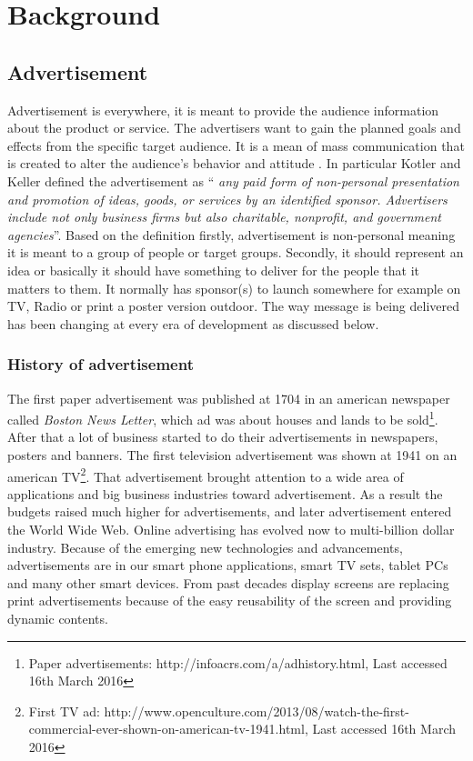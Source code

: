 
\chapter{Background} %

\label{Chapter2} %
\newpage

\section{Advertisement}
Advertisement is everywhere, it is meant to provide the audience information about the product or service. The advertisers want to gain the planned goals and effects from the specific target audience. It is a mean of mass communication that is created to alter the audience’s behavior and attitude \cite{advertisementdef}. In particular Kotler and Keller \cite{ad_def} defined the advertisement as ``\emph{ any paid form of non-personal presentation and promotion of ideas, goods, or services by an identified sponsor. Advertisers include not only business firms but also charitable, nonprofit, and government agencies}''. Based on the definition firstly, advertisement is non-personal meaning it is meant to a group of people or target groups. Secondly, it should represent an idea or basically it should have something to deliver for the people that it matters to them. It normally has sponsor(s) to launch somewhere for example on TV, Radio or print a poster version outdoor. The way message is being delivered has been changing at every era of development as discussed below.



\subsection{History of advertisement}
The first paper advertisement was published at 1704 in an american newspaper called \emph{Boston News Letter}, which ad was about houses and lands to be sold\footnote{Paper advertisements: http://infoacrs.com/a/adhistory.html, Last accessed 16th March 2016}. After that a lot of business started to do their advertisements in newspapers, posters and banners. The first television advertisement was shown at 1941 on an american TV\footnote {First TV ad: http://www.openculture.com/2013/08/watch-the-first-commercial-ever-shown-on-american-tv-1941.html, Last accessed 16th March 2016}. That advertisement brought attention to a wide area of applications and big business industries toward advertisement. As a result the budgets raised much higher for advertisements, and later advertisement entered the World Wide Web. Online advertising has evolved now to multi-billion dollar industry. Because of the emerging new technologies and advancements, advertisements are in our smart phone applications, smart TV sets, tablet PCs and many other smart devices. From past decades display screens are replacing print advertisements because of the easy reusability of the screen and providing dynamic contents.

